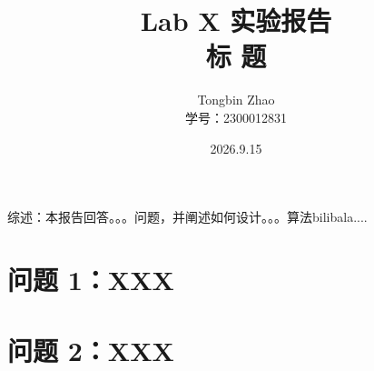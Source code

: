 \documentclass[UTF8,a4paper,11pt,fontset=fandol]{ctexart}
\title{Lab X 实验报告\\\large 标  题}
\author{Tongbin Zhao\\学号：2300012831}
\date{2026.9.15}
\begin{document}
\pagestyle{plain}
\maketitle
\vspace{-2.5em}

综述：本报告回答。。。问题，并阐述如何设计。。。算法bilibala....

\section{问题 1：XXX}

\section{问题 2：XXX}

\newpage
{}
\end{document}

